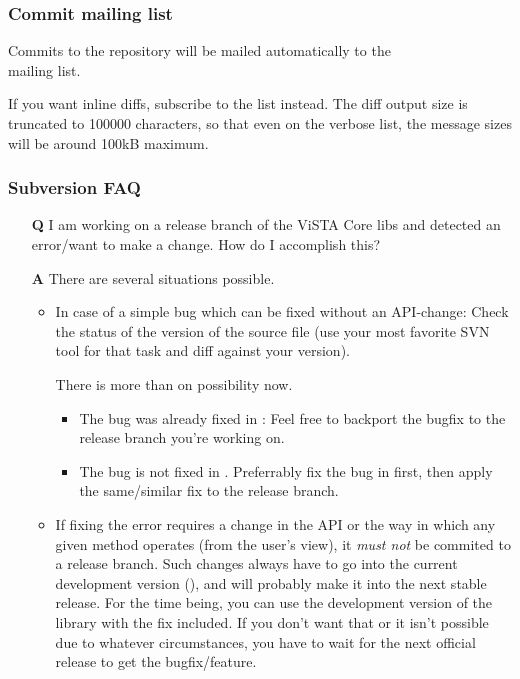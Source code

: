 \subsubsection{Commit mailing list}

Commits to the  repository will be mailed automatically to the \\
 mailing list.

If you want inline diffs, subscribe to the  list instead.
The diff output size is truncated to 100000 characters, so that even on the verbose list, the message sizes will be around 100kB maximum.

\subsubsection{Subversion FAQ}

\begin{itemize}
\item[\textbf{Q}] I am working on a release branch of the ViSTA Core libs and detected an error/want to make a change.
  How do I accomplish this?
\item[\textbf{A}] There are several situations possible.

  \begin{itemize}
  \item In case of a simple bug which can be fixed without an API-change:
	Check the status of the  version of the source file (use your most favorite SVN tool for that task and diff against your version).

	There is more than on possibility now.
	\begin{itemize}
	\item The bug was already fixed in :
      Feel free to backport the bugfix to the release branch you're working on.
    \item The bug is not fixed in .
	  Preferrably fix the bug in  first, then apply the same/similar fix to the release branch.
	\end{itemize}
	
  \item If fixing the error requires a change in the API or the way in which any given method operates (from the user's view), it \emph{must not} be commited to a release branch. Such changes always have to go into the current development version (), and will probably make it into the next stable release. For the time being, you can use the development version of the library with the fix included. If you don't want that or it isn't possible due to whatever circumstances, you have to wait for the next official release to get the bugfix/feature.
  \end{itemize}
\end{itemize}


